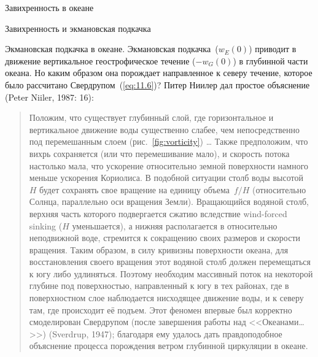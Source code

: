 \begin{chapter}{Завихренность в океане}
\begin{section}{Завихренность и экмановская подкачка}
\begin{paragraph}{Экмановская подкачка в океане.}
Экмановская подкачка~($w_E (0)$) приводит в движение вертикальное
геострофическое течение ($-w_G(0)$) в глубинной части океана. Но каким образом
она порождает направленное к северу течение, которое было рассчитано
Свердрупом~(\ref{eq:11.6})? Питер Ниилер дал простое 
объяснение (Peter Niiler, 1987: 16):
%
\begin{quotation}
Положим, что существует глубинный слой, где горизонтальное и
вертикальное движение воды существенно слабее, чем непосредственно под
перемешанным слоем
(рис.~\ref{fig:vorticity}) \dots{} Также предположим, что вихрь
сохраняется (или что перемешивание мало), и скорость потока настолько мала,
что ускорение относительно земной поверхности намного меньше ускорения
Кориолиса. В подобной ситуации столб воды высотой~$H$ будет сохранять
свое вращение на единицу объема~$f/H$ (относительно Солнца, параллельно
оси вращения Земли). Вращающийся водяной столб, верхняя часть которого 
подвергается сжатию вследствие wind-forced sinking ($H$ уменьшается), 
а нижняя располагается в относительно неподвижной воде, стремится к 
сокращению своих размеров и скорости вращения. Таким образом, в силу
кривизны поверхности океана, для восстановления своего вращения этот 
водяной столб должен перемещаться к югу либо удлиняться.
Поэтому необходим массивный поток на некоторой глубине под
поверхностью, направленный к югу в тех районах, где в поверхностном слое
наблюдается нисходящее движение воды, и к северу там, где происходит её 
подъем. Этот феномен впервые был корректно смоделирован
Свердрупом (после завершения работы над <<Океанами\dots{}>>) (Sverdrup, 1947); 
благодаря ему удалось дать правдоподобное объяснение процесса порождения 
ветром глубинной циркуляции в океане.
\end{quotation}

\end{paragraph}
\end{section}
\end{chapter}
